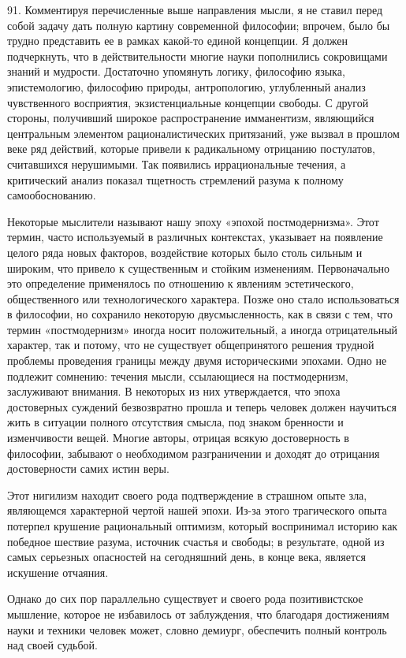 \documentclass[a5paper,10pt]{article}
\begin{document}
91. Комментируя перечисленные выше направления мысли, я не ставил перед собой
задачу дать полную картину современной философии; впрочем, было бы трудно
представить ее в рамках какой-то единой концепции. Я должен подчеркнуть, что в
действительности многие науки пополнились сокровищами знаний и мудрости.
Достаточно упомянуть логику, философию языка, эпистемологию, философию природы,
антропологию, углубленный анализ чувственного восприятия, экзистенциальные
концепции свободы. С другой стороны, получивший широкое распространение
имманентизм, являющийся центральным элементом рационалистических притязаний,
уже вызвал в прошлом веке ряд действий, которые привели к радикальному
отрицанию постулатов, считавшихся нерушимыми. Так появились иррациональные
течения, а критический анализ показал тщетность стремлений разума к полному
самообоснованию.

Некоторые мыслители называют нашу эпоху «эпохой постмодернизма». Этот термин,
часто используемый в различных контекстах, указывает на появление целого ряда
новых факторов, воздействие которых было столь сильным и широким, что привело к
существенным и стойким изменениям. Первоначально это определение применялось по
отношению к явлениям эстетического, общественного или технологического
характера. Позже оно стало использоваться в философии, но сохранило некоторую
двусмысленность, как в связи с тем, что термин «постмодернизм» иногда носит
положительный, а иногда отрицательный характер, так и потому, что не существует
общепринятого решения трудной проблемы проведения границы между двумя
историческими эпохами. Одно не подлежит сомнению: течения мысли, ссылающиеся на
постмодернизм, заслуживают внимания. В некоторых из них утверждается, что эпоха
достоверных суждений безвозвратно прошла и теперь человек должен научиться жить
в ситуации полного отсутствия смысла, под знаком бренности и изменчивости
вещей. Многие авторы, отрицая всякую достоверность в философии, забывают о
необходимом разграничении и доходят до отрицания достоверности самих истин
веры.

Этот нигилизм находит своего рода подтверждение в страшном опыте зла,
являющемся характерной чертой нашей эпохи. Из-за этого трагического опыта
потерпел крушение рациональный оптимизм, который воспринимал историю как
победное шествие разума, источник счастья и свободы; в результате, одной из
самых серьезных опасностей на сегодняшний день, в конце века, является
искушение отчаяния.

Однако до сих пор параллельно существует и своего рода позитивистское мышление,
которое не избавилось от заблуждения, что благодаря достижениям науки и техники
человек может, словно демиург, обеспечить полный контроль над своей судьбой.
\end{document}
